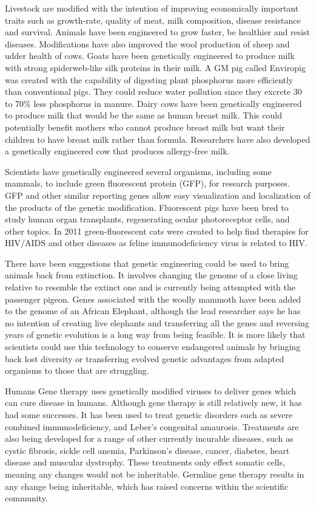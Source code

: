 Livestock are modified with the intention of improving economically important traits such as growth-rate, quality of meat, milk composition, disease resistance and survival. Animals have been engineered to grow faster, be healthier and resist diseases. Modifications have also improved the wool production of sheep and udder health of cows. Goats have been genetically engineered to produce milk with strong spiderweb-like silk proteins in their milk. A GM pig called Enviropig was created with the capability of digesting plant phosphorus more efficiently than conventional pigs. They could reduce water pollution since they excrete 30 to 70\% less phosphorus in manure. Dairy cows have been genetically engineered to produce milk that would be the same as human breast milk. This could potentially benefit mothers who cannot produce breast milk but want their children to have breast milk rather than formula. Researchers have also developed a genetically engineered cow that produces allergy-free milk.

Scientists have genetically engineered several organisms, including some mammals, to include green fluorescent protein (GFP), for research purposes. GFP and other similar reporting genes allow easy visualization and localization of the products of the genetic modification. Fluorescent pigs have been bred to study human organ transplants, regenerating ocular photoreceptor cells, and other topics. In 2011 green-fluorescent cats were created to help find therapies for HIV/AIDS and other diseases as feline immunodeficiency virus is related to HIV.

There have been suggestions that genetic engineering could be used to bring animals back from extinction. It involves changing the genome of a close living relative to resemble the extinct one and is currently being attempted with the passenger pigeon. Genes associated with the woolly mammoth have been added to the genome of an African Elephant, although the lead researcher says he has no intention of creating live elephants and transferring all the genes and reversing years of genetic evolution is a long way from being feasible. It is more likely that scientists could use this technology to conserve endangered animals by bringing back lost diversity or transferring evolved genetic advantages from adapted organisms to those that are struggling.

Humans
Gene therapy uses genetically modified viruses to deliver genes which can cure disease in humans. Although gene therapy is still relatively new, it has had some successes. It has been used to treat genetic disorders such as severe combined immunodeficiency, and Leber's congenital amaurosis. Treatments are also being developed for a range of other currently incurable diseases, such as cystic fibrosis, sickle cell anemia, Parkinson's disease, cancer, diabetes, heart disease and muscular dystrophy. These treatments only effect somatic cells, meaning any changes would not be inheritable. Germline gene therapy results in any change being inheritable, which has raised concerns within the scientific community.

